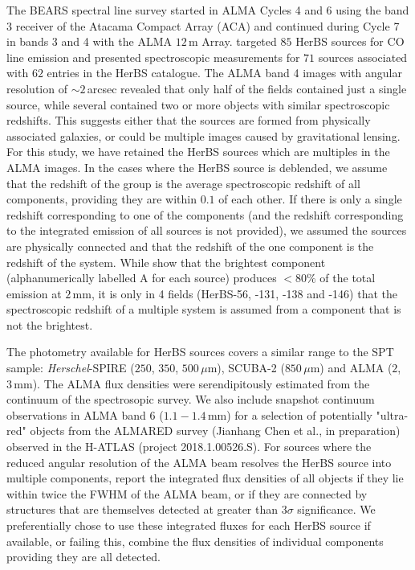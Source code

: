 The BEARS spectral line survey started in ALMA Cycles 4 and 6 using the band 3 receiver of the Atacama Compact Array (ACA) and continued during Cycle 7 in bands 3 and 4 with the ALMA $12\,$m Array. \citealt{Urquhart_2022} targeted $85$ HerBS sources for CO line emission and presented spectroscopic measurements for $71$ sources associated with $62$ entries in the HerBS catalogue. The ALMA band 4 images with angular resolution of $\sim 2\,$arcsec revealed that only half of the fields contained just a single source, while several contained two or more objects with similar spectroscopic redshifts. This suggests either that the sources are formed from physically associated galaxies, or could be multiple images caused by gravitational lensing. For this study, we have retained the HerBS sources which are multiples in the ALMA images. In the cases where the HerBS source is deblended, we assume that the redshift of the group is the average spectroscopic redshift of all components, providing they are within $0.1$ of each other. If there is only a single redshift corresponding to one of the components (and the redshift corresponding to the integrated emission of all sources is not provided), we assumed the sources are physically connected and that the redshift of the one component is the redshift of the system. While \citealt{Bendo_2023} show that the brightest component (alphanumerically labelled A for each source) produces $< 80\%$ of the total emission at $2\,$mm, it is only in 4 fields (HerBS-56, -131, -138 and -146) that the spectroscopic redshift of a multiple system is assumed from a component that is not the brightest.

The photometry available for HerBS sources covers a similar range to the SPT sample: \textit{Herschel}-SPIRE ($250$, $350$, $500\,\mu$m), SCUBA-2 ($850\,\mu$m) and ALMA ($2$, $3\,$mm). The ALMA flux densities were serendipitously estimated from the continuum of the spectrosopic survey. We also include snapshot continuum observations in ALMA band 6 ($1.1 - 1.4\,$mm) for a selection of potentially "ultra-red" objects from the ALMARED survey (Jianhang Chen et al., in preparation) observed in the H-ATLAS (project 2018.1.00526.S). For sources where the reduced angular resolution of the ALMA beam resolves the HerBS source into multiple components, \citealt{Bendo_2023} report the integrated flux densities of all objects if they lie within twice the FWHM of the ALMA beam, or if they are connected by structures that are themselves detected at greater than 3$\sigma$ significance. We preferentially chose to use these integrated fluxes for each HerBS source if available, or failing this, combine the flux densities of individual components providing they are all detected.

